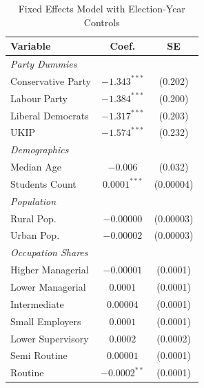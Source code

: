 \documentclass[12pt,letterpaper]{article}
\begin{document}
\begin{table}[!htbp] \centering
	\caption{Fixed Effects Model with Election-Year Controls}
	\label{tab:1wfe}
	\footnotesize
	\setlength{\tabcolsep}{4pt}
	\begin{tabular}{lcc}
		\toprule
		\textbf{Variable} & \textbf{Coef.} & \textbf{SE} \\
		\midrule
		\textit{Party Dummies} \\
		\hspace{3mm}Conservative Party & $-1.343^{***}$ & (0.202) \\
		\hspace{3mm}Labour Party & $-1.384^{***}$ & (0.200) \\
		\hspace{3mm}Liberal Democrats & $-1.317^{***}$ & (0.203) \\
		\hspace{3mm}UKIP & $-1.574^{***}$ & (0.232) \\
		\textit{Demographics} \\
		\hspace{3mm}Median Age & $-0.006$ & (0.032) \\
		\hspace{3mm}Students Count & $0.0001^{***}$ & (0.00004) \\
		\textit{Population} \\
		\hspace{3mm}Rural Pop. & $-0.00000$ & (0.00003) \\
		\hspace{3mm}Urban Pop. & $-0.00002$ & (0.00003) \\
		\textit{Occupation Shares} \\
		\hspace{3mm}Higher Managerial & $-0.00001$ & (0.0001) \\
		\hspace{3mm}Lower Managerial & $0.0001$ & (0.0001) \\
		\hspace{3mm}Intermediate & $0.00004$ & (0.0001) \\
		\hspace{3mm}Small Employers & $0.0001$ & (0.0001) \\
		\hspace{3mm}Lower Supervisory & $0.0002$ & (0.0002) \\
		\hspace{3mm}Semi Routine & $0.00001$ & (0.0001) \\
		\hspace{3mm}Routine & $-0.0002^{**}$ & (0.0001) \\

\end{tabular}
\end{table}
\end{document}
